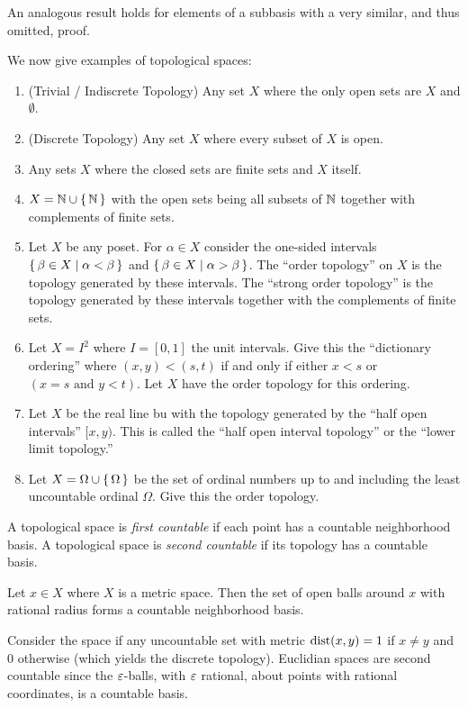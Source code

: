 \documentclass[letterpaper, 11pt]{article}
\begin{document}
An analogous result holds for elements of a subbasis with a very similar, and thus omitted, proof.

\begin{ex}
  We now give examples of topological spaces:
  \begin{enumerate}
  \item (Trivial / Indiscrete Topology) Any set $X$ where the only open sets are $X$ and $\emptyset$.
  \item (Discrete Topology) Any set $X$ where every subset of $X$ is open.
  \item Any sets $X$ where the closed sets are finite sets and $X$ itself.
  \item $X = \mathbb{N} \cup \set{\mathbb{N}}$ with the open sets being all subsets of $\mathbb{N}$ together with complements of finite sets.
  \item Let $X$ be any poset.
        For $\alpha \in X$ consider the one-sided intervals $\set{\beta \in X | \alpha < \beta}$ and $\set{\beta \in X | \alpha > \beta}$.
        The ``order topology'' on $X$ is the topology generated by these intervals.
        The ``strong order topology'' is the topology generated by these intervals together with the complements of finite sets.
  \item Let $X = I^{2}$ where $I = [0, 1]$ the unit intervals.
        Give this the ``dictionary ordering'' where $(x, y) < (s, t)$ if and only if either $x < s$ or $(x = s \text{ and } y < t)$.
        Let $X$ have the order topology for this ordering.
  \item Let $X$ be the real line bu with the topology generated by the ``half open intervals'' $[x, y)$.
        This is called the ``half open interval topology'' or the ``lower limit topology.''
  \item Let $X = \Omega \cup \set{\Omega}$ be the set of ordinal numbers up to and including the least uncountable ordinal $\Omega$.
        Give this the order topology.
  \end{enumerate}
\end{ex}

\begin{defn}[Countability]
  A topological space is \emph{first countable} if each point has a countable neighborhood basis.
  A topological space is \emph{second countable} if its topology has a countable basis.
\end{defn}

\clearpage

\begin{ex}
  Let $x \in X$ where $X$ is a metric space.
  Then the set of open balls around $x$ with rational radius forms a countable neighborhood basis.

  Consider the space if any uncountable set with metric $\operatorname{dist}(x, y) = 1$ if $x \neq y$ and $0$ otherwise (which yields the discrete topology).
  Euclidian spaces are second countable since the $\varepsilon$-balls, with $\varepsilon$ rational, about points with rational coordinates, is a countable basis.
\end{ex}
\end{document}
